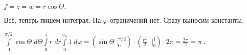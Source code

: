 \documentclass[a4paper, fleqn]{article}
\begin{document}
    $f = z = w = r \cos \Theta.$
    
    Всё, теперь пишем интеграл. На $\varphi$ ограничений нет. Сразу выносим константы.
    
    $\displaystyle \int\limits_{0}^{\pi / 2}  \cos \Theta \; d \Theta \int \limits_{0}^{1} r\;  dr \int\limits_{0}^{2 \pi} 1\;  d \varphi  =  \left( \sin \Theta \; \Bigg|_{0}^{\pi/2}\right) \cdot \left(\frac{r^2}{2} \;  \; \Bigg|_{0}^{1} \right) \cdot 2 \pi= \frac{2 \pi}{2} = \boxed{\pi} \; .$
    
    
    
    
    
    
    
    
    
\end{document}
